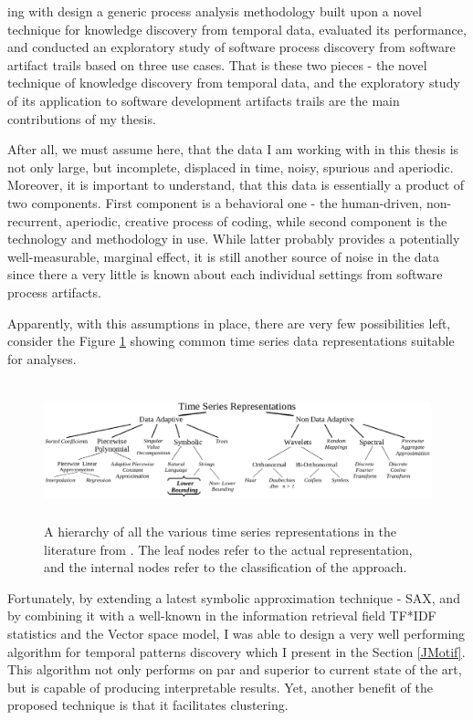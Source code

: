 \documentclass[11pt,oneside]{article}
\numberwithin{equation}{subsection}
\begin{document}
ing with design a
generic process analysis methodology built upon a novel technique for knowledge discovery from
temporal data, evaluated its performance, and conducted an exploratory study of software process
discovery from software artifact trails based on
three use cases. That is these two pieces - the novel technique of knowledge discovery from
temporal data, and the exploratory study of its application to software development artifacts
trails are the main contributions of my thesis.

After all, we must assume here, that the data I am working with in this thesis is not
only large, but incomplete, displaced in time, noisy, spurious and aperiodic. Moreover, it is
important to understand, that this data is essentially a product of two components. First component
is a behavioral one - the human-driven, non-recurrent, aperiodic, creative process of coding, while
second component is the technology and methodology in use. While latter probably provides a
potentially well-measurable, marginal effect, it is still another source of noise in the data since
there a very little is known about each individual settings from software process artifacts.

Apparently, with this assumptions in place, there are very few possibilities
left, consider the Figure \ref{fig:timeseries-representations} showing common time series data
representations suitable for analyses.

\begin{figure}[tbp]
   \centering
   \includegraphics[height=40mm]{representations.eps}
   \caption{A hierarchy of all the various time series representations in the literature from
       \cite{citeulike:2821475}. The leaf nodes refer to the actual representation, and the internal
            nodes refer to the classification of the approach.}
   \label{fig:timeseries-representations}
\end{figure}

Fortunately, by extending a latest symbolic approximation technique - SAX, and by combining it with
a well-known in the information retrieval field TF*IDF statistics and the Vector space model, I was
able to design a very well performing algorithm for temporal patterns discovery which I present in
the Section \ref{JMotif}. This algorithm not only performs on par and superior to current
state of the art, but is capable of producing interpretable results. Yet, another benefit of the
proposed technique is that it facilitates clustering.
\end{document}

